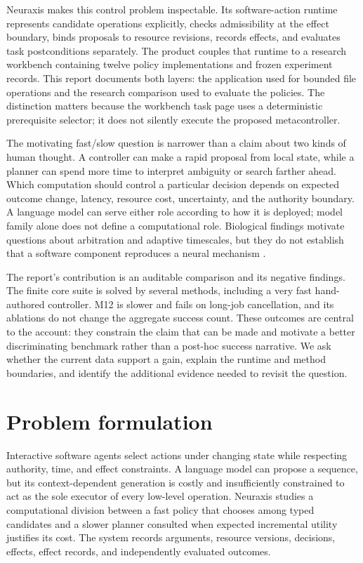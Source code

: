 \documentclass[11pt]{article}
\begin{document}
Neuraxis makes this control problem inspectable. Its software-action runtime represents candidate operations explicitly, checks admissibility at the effect boundary, binds proposals to resource revisions, records effects, and evaluates task postconditions separately. The product couples that runtime to a research workbench containing twelve policy implementations and frozen experiment records. This report documents both layers: the application used for bounded file operations and the research comparison used to evaluate the policies. The distinction matters because the workbench task page uses a deterministic prerequisite selector; it does not silently execute the proposed metacontroller.

The motivating fast/slow question is narrower than a claim about two kinds of human thought. A controller can make a rapid proposal from local state, while a planner can spend more time to interpret ambiguity or search farther ahead. Which computation should control a particular decision depends on expected outcome change, latency, resource cost, uncertainty, and the authority boundary. A language model can serve either role according to how it is deployed; model family alone does not define a computational role. Biological findings motivate questions about arbitration and adaptive timescales, but they do not establish that a software component reproduces a neural mechanism \cite{daw2005,lee2014,kool2016,mante2013,dptagent}.

The report's contribution is an auditable comparison and its negative findings. The finite core suite is solved by several methods, including a very fast hand-authored controller. M12 is slower and fails on long-job cancellation, and its ablations do not change the aggregate success count. These outcomes are central to the account: they constrain the claim that can be made and motivate a better discriminating benchmark rather than a post-hoc success narrative. We ask whether the current data support a gain, explain the runtime and method boundaries, and identify the additional evidence needed to revisit the question.

\section{Problem formulation}
Interactive software agents select actions under changing state while respecting authority, time, and effect constraints. A language model can propose a sequence, but its context-dependent generation is costly and insufficiently constrained to act as the sole executor of every low-level operation. Neuraxis studies a computational division between a fast policy that chooses among typed candidates and a slower planner consulted when expected incremental utility justifies its cost. The system records arguments, resource versions, decisions, effects, effect records, and independently evaluated outcomes.
\end{document}
